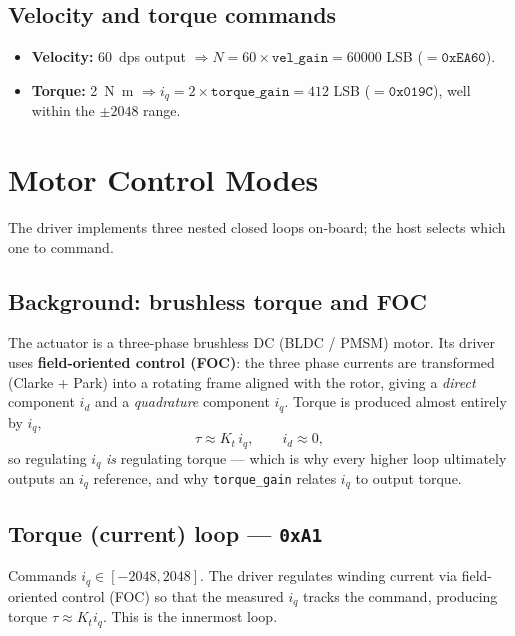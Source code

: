 \documentclass[11pt,a4paper]{article}
\newcommand{\code}[1]{\texttt{#1}}
\begin{document}
\subsection{Velocity and torque commands}
\begin{itemize}[nosep]
  \item \textbf{Velocity:} \SI{60}{dps} output $\Rightarrow
        N = 60\times\texttt{vel\_gain} = 60000$ LSB ($=\mathtt{0xEA60}$).
  \item \textbf{Torque:} \SI{2}{\newton\meter} $\Rightarrow
        i_q = 2\times\texttt{torque\_gain} = 412$ LSB ($=\mathtt{0x019C}$), well
        within the $\pm2048$ range.
\end{itemize}

\section{Motor Control Modes}

The driver implements three nested closed loops on-board; the host selects which
one to command.

\subsection{Background: brushless torque and FOC}
The actuator is a three-phase brushless DC (BLDC / PMSM) motor. Its driver uses
\textbf{field-oriented control (FOC)}: the three phase currents are transformed
(Clarke + Park) into a rotating frame aligned with the rotor, giving a
\emph{direct} component $i_d$ and a \emph{quadrature} component $i_q$. Torque is
produced almost entirely by $i_q$,
\begin{equation}
  \tau \approx K_t\, i_q, \qquad i_d \approx 0,
\end{equation}
so regulating $i_q$ \emph{is} regulating torque --- which is why every higher
loop ultimately outputs an $i_q$ reference, and why \code{torque\_gain} relates
$i_q$ to output torque.

\subsection{Torque (current) loop --- \texttt{0xA1}}
Commands $i_q\in[-2048,2048]$. The driver regulates winding current via
field-oriented control (FOC) so that the measured $i_q$ tracks the command,
producing torque $\tau \approx K_t i_q$. This is the innermost loop.
\end{document}
